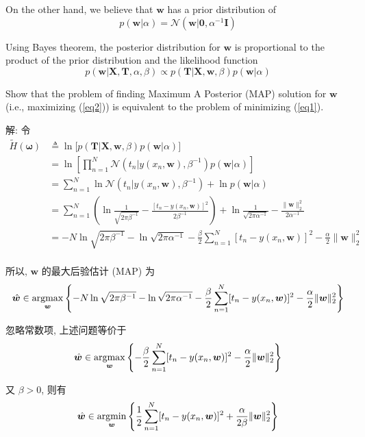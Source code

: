\documentclass{article}
\begin{document}
On the other hand, we believe that $\bm{w}$ has a prior distribution of 
\[
p(\bm{w} | \alpha) = \mathcal{N} (\bm{w} | \bm{0}, \alpha^{-1} \bm{I})
\]

Using Bayes theorem, the posterior distribution for $\bm{w}$ is proportional to the product of the prior distribution and the likelihood function
\begin{equation}
\label{eq2}
p(\bm{w} | \bm{X}, \bm{T}, \alpha, \beta) \propto 
p(\bm{T} | \bm{X}, \bm{w}, \beta) p(\bm{w} | \alpha)
\end{equation}

Show that the problem of finding Maximum A Posterior (MAP) solution for $\bm{w}$ (i.e., maximizing (\ref{eq2})) is equivalent to the problem of minimizing (\ref{eq1}).

解: 令
\begin{equation}
  \begin{aligned}
    \tilde{H}(\bm{\omega})
    &\triangleq\ln\big[p(\bm{T} | \bm{X}, \bm{w}, \beta) p(\bm{w}|\alpha)\big]\\
    &=\ln\left[\prod_{n=1}^N \mathcal{N}(t_n|y(x_n,\bm{w}),\beta^{-1})p(\bm{w}|\alpha)\right]\\
    &=\sum_{n=1}^N\ln\mathcal{N}(t_n|y(x_n,\bm{w}),\beta^{-1})+\ln p(\bm{w}|\alpha)\\
    &=\sum_{n=1}^N\left(\ln\frac{1}{\sqrt{2\pi\beta^{-1}}}-\frac{[t_n-y(x_n,\bm{w})]^2}{2\beta^{-1}}\right)+\ln\frac{1}{\sqrt{2\pi\alpha^{-1}}}-\frac{\|\bm{w}\|_2^2}{2\alpha^{-1}}\\
    &=-N\ln\sqrt{2\pi\beta^{-1}}-\ln\sqrt{2\pi\alpha^{-1}}-\frac{\beta}{2}\sum_{n=1}^N[t_n-y(x_n,\bm{w})]^2-\frac{\alpha}{2}\|\bm{w}\|_2^2\\
  \end{aligned}
\end{equation}

所以, $\bm{w}$ 的最大后验估计 (MAP) 为
\begin{equation}
  \hat{\bm{w}}\in\operatorname*{argmax}_{\bm{w}}\left\{-N\ln\sqrt{2\pi\beta^{-1}}-\ln\sqrt{2\pi\alpha^{-1}}-\frac{\beta}{2}\sum_{n=1}^N[t_n-y(x_n,\bm{w})]^2-\frac{\alpha}{2}\|\bm{w}\|_2^2\right\}
\end{equation}

忽略常数项, 上述问题等价于
\begin{equation}
  \hat{\bm{w}}\in\operatorname*{argmax}_{\bm{w}}\left\{-\frac{\beta}{2}\sum_{n=1}^N[t_n-y(x_n,\bm{w})]^2-\frac{\alpha}{2}\|\bm{w}\|_2^2\right\}
\end{equation}

又 $\beta>0$, 则有
\begin{equation}
  \label{eq:map}
  \hat{\bm{w}}\in\operatorname*{argmin}_{\bm{w}}\left\{\frac{1}{2}\sum_{n=1}^N[t_n-y(x_n,\bm{w})]^2+\frac{\alpha}{2\beta}\|\bm{w}\|_2^2\right\}
\end{equation}
\end{document}
